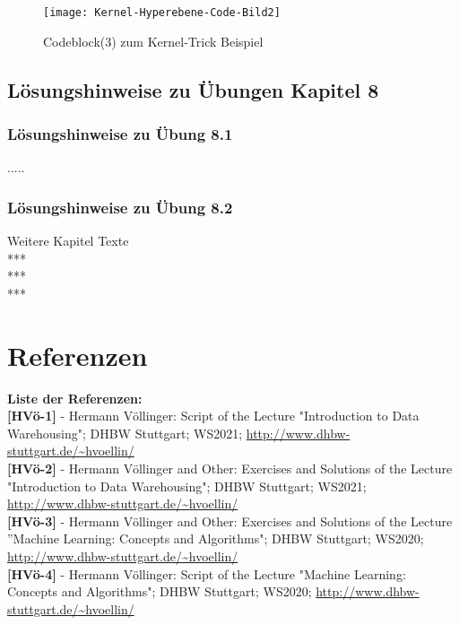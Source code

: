 \documentclass[12pt]{article}
\begin{document}
\begin{figure}[htp]
  \centering
  \hspace*{-0.5cm} 
  \texttt{[image: Kernel-Hyperebene-Code-Bild2]}
  \caption{Codeblock(3) zum Kernel-Trick Beispiel}
  \label{fig:SVM_Ebenen}
\end{figure}

\newpage

\subsection{Lösungshinweise zu Übungen Kapitel 8}

\subsubsection{Lösungshinweise zu Übung 8.1}
.....\\
\subsubsection{Lösungshinweise zu Übung 8.2}
Weitere Kapitel Texte \\
***\\
***\\
***

\newpage

\section{Referenzen}

\textbf{Liste der Referenzen:} \\

\textbf{[HVö-1]} - Hermann Völlinger: Script of the Lecture "Introduction to Data Warehousing"; DHBW Stuttgart; WS2021; \url{http://www.dhbw-stuttgart.de/~hvoellin/}\\ 

\textbf{[HVö-2]} - Hermann Völlinger and Other: Exercises and Solutions of the Lecture "Introduction to Data Warehousing"; DHBW Stuttgart; WS2021; \url{http://www.dhbw-stuttgart.de/~hvoellin/}\\

\textbf{[HVö-3]} - Hermann Völlinger and Other: Exercises and Solutions of the Lecture ”Machine Learning: Concepts and Algorithms"; DHBW Stuttgart; WS2020; \url{http://www.dhbw-stuttgart.de/~hvoellin/}\\

\textbf{[HVö-4]} - Hermann Völlinger: Script of the Lecture "Machine Learning: Concepts and Algorithms"; DHBW Stuttgart; WS2020; \url{http://www.dhbw-stuttgart.de/~hvoellin/}\\ 
\end{document}
